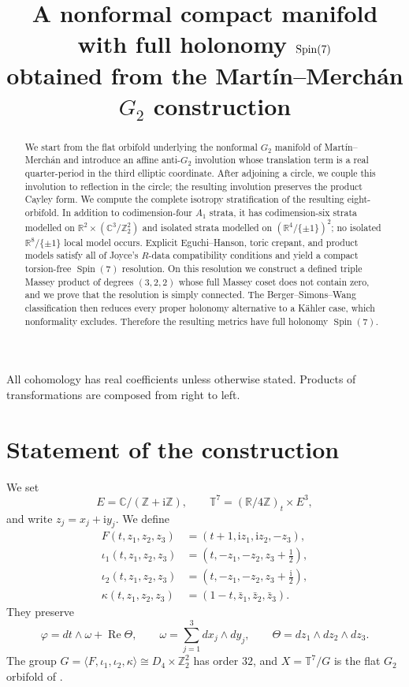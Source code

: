 \documentclass[11pt]{article}
\title{A nonformal compact manifold with full holonomy $\SpinSeven$\\
obtained from the Mart\'in--Merch\'an $G_2$ construction}
\author{}\date{}
\theoremstyle{remark}\newtheorem{remark}[theorem]{Remark}
\newcommand{\SpinSeven}{\operatorname{Spin}(7)}
\newcommand{\ii}{\mathrm i}
\newcommand{\T}{\mathbb T}
\newcommand{\R}{\mathbb R}
\newcommand{\C}{\mathbb C}
\newcommand{\Z}{\mathbb Z}
\begin{document}
\maketitle

\begin{abstract}
We start from the flat orbifold underlying the nonformal $G_2$ manifold of
Mart\'in--Merch\'an and introduce an affine anti-$G_2$ involution whose
translation term is a real quarter-period in the third elliptic coordinate.
After adjoining a circle, we couple this involution to reflection in the
circle; the resulting involution preserves the product Cayley form.  We
compute the complete isotropy stratification of the resulting
eight-orbifold.  In addition to codimension-four $A_1$ strata, it has
codimension-six strata modelled on
$\R^2\times(\C^3/\Z_2^2)$ and isolated strata modelled on
$(\R^4/\{\pm1\})^2$; no isolated $\R^8/\{\pm1\}$ local model occurs.
Explicit Eguchi--Hanson, toric crepant, and product models satisfy all of
Joyce's $R$-data compatibility conditions and yield a compact torsion-free
$\SpinSeven$ resolution.  On this resolution we construct a defined triple
Massey product of degrees $(3,2,2)$ whose full Massey coset does not contain
zero, and we prove that the resolution is simply connected.  The
Berger--Simons--Wang classification then reduces every proper holonomy
alternative to a K\"ahler case, which nonformality excludes.  Therefore the
resulting metrics have full holonomy $\SpinSeven$.
\end{abstract}

All cohomology has real coefficients unless otherwise stated.  Products of
transformations are composed from right to left.

\section{Statement of the construction}
We set
\[
E=\C/(\Z+\ii\Z),\qquad \T^7=(\R/4\Z)_t\times E^3,
\]
and write $z_j=x_j+\ii y_j$.  We define
\begin{align}
F(t,z_1,z_2,z_3)&=(t+1,\ii z_1,\ii z_2,-z_3),\label{eq:F}\\
\iota _1(t,z_1,z_2,z_3)&=(t,-z_1,-z_2,z_3+\tfrac12),\label{eq:i1}\\
\iota _2(t,z_1,z_2,z_3)&=(t,-z_1,-z_2,z_3+\tfrac{\ii}{2}),\label{eq:i2}\\
\kappa(t,z_1,z_2,z_3)&=(1-t,\bar z_1,\bar z_2,\bar z_3).\label{eq:kappa}
\end{align}
They preserve
\begin{equation}\label{eq:g2form}
\varphi=dt\wedge\omega+\operatorname{Re}\Theta,
\qquad \omega=\sum_{j=1}^3dx_j\wedge dy_j,
\qquad \Theta=dz_1\wedge dz_2\wedge dz_3.
\end{equation}
The group $G=\langle F,\iota _1,\iota _2,\kappa\rangle
\cong D_4\times\Z_2^2$ has order $32$, and $X=\T^7/G$ is the flat $G_2$
orbifold of \cite{MM}.
\end{document}

